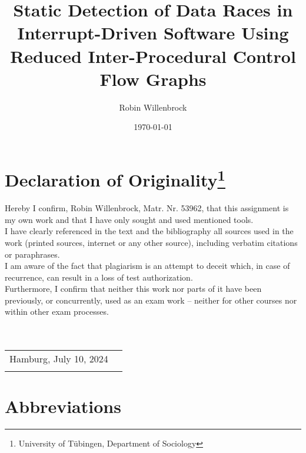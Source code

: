 \documentclass[
fancyheadings, %
%
%
]{stsreprt}
\author{Robin Willenbrock}
\title{Static Detection of Data Races in Interrupt-Driven Software Using Reduced Inter-Procedural Control Flow Graphs}
\date{\today}
\begin{document}
	\frontmatter
	\maketitle
	\chapter*{Declaration of Originality\footnote{University of Tübingen, Department of Sociology}}
		Hereby I confirm, Robin Willenbrock, Matr. Nr. 53962,
		that this assignment is my own work and that I have only sought and used mentioned tools.
		\\
		I have clearly referenced in the text and the bibliography all sources used in the work (printed
		sources, internet or any other source), including verbatim citations or paraphrases.
		\\
		I am aware of the fact that plagiarism is an attempt to deceit which, in case of recurrence, can result in a loss of
		test authorization. 
		\\
		Furthermore, I confirm that neither this work nor parts of it have been
		previously, or concurrently, used as an exam work – neither for other courses nor within other
		exam processes.\\
		\\
		\\
		\noindent
		\begin{tabular}{@{}l@{}r@{}}
			Hamburg, July 10, 2024 & \hspace{5cm}\makebox[5cm]{\hrulefill} \\ 
			& \hspace{5cm}{\textit{Robin Willenbrock}} 
		\end{tabular}
	\tableofcontents
	\listoffigures{}
	\listofalgorithms
	
	\chapter*{Abbreviations}
	\begin{acronym}
	\end{acronym}
	
\end{document}
